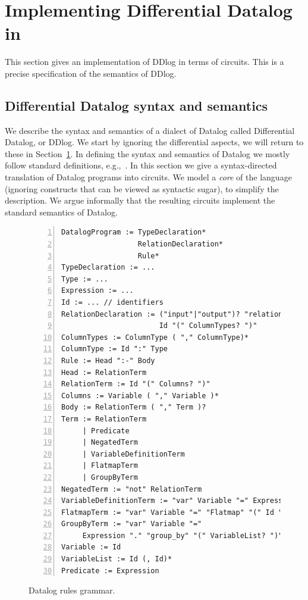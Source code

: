 \section{Implementing Differential Datalog in \dbsp}\label{sec:ddlog}\label{sec:datalog}

This section gives an implementation of DDlog in terms of \dbsp
circuits.  This is a precise specification of the semantics of DDlog.

\subsection{Differential Datalog syntax and semantics}\label{sec:datalog-syntax}

We describe the syntax and semantics of a dialect of Datalog called
Differential Datalog, or DDlog.  We start by ignoring the differential
aspects, we will return to these in Section~\ref{sec:ddlog}.  In
defining the syntax and semantics of Datalog we mostly follow standard
definitions, e.g.,~\cite{Abiteboul-book95}.  In this section we give a
syntax-directed translation of Datalog programs into circuits.  We
model a \emph{core} of the language (ignoring constructs that can be
viewed as syntactic sugar), to simplify the description.  We argue
informally that the resulting circuits implement the standard
semantics of Datalog.

\begin{figure}[t]
{\small
\begin{lstlisting}[numbers=left]
DatalogProgram := TypeDeclaration*
                  RelationDeclaration*
                  Rule*
TypeDeclaration := ...
Type := ...
Expression := ...
Id := ... // identifiers
RelationDeclaration := ("input"|"output")? "relation"
                       Id "(" ColumnTypes? ")"
ColumnTypes := ColumnType ( "," ColumnType)*
ColumnType := Id ":" Type
Rule := Head ":-" Body
Head := RelationTerm
RelationTerm := Id "(" Columns? ")"
Columns := Variable ( "," Variable )*
Body := RelationTerm ( "," Term )?
Term := RelationTerm
     | Predicate
     | NegatedTerm
     | VariableDefinitionTerm
     | FlatmapTerm
     | GroupByTerm
NegatedTerm := "not" RelationTerm
VariableDefinitionTerm := "var" Variable "=" Expression
FlatmapTerm := "var" Variable "=" "Flatmap" "(" Id ")"
GroupByTerm := "var" Variable "="
     Expression "." "group_by" "(" VariableList? ")"
Variable := Id
VariableList := Id (, Id)*
Predicate := Expression
\end{lstlisting}
}
\caption{Datalog rules grammar.\label{fig:grammar}}
\end{figure}

